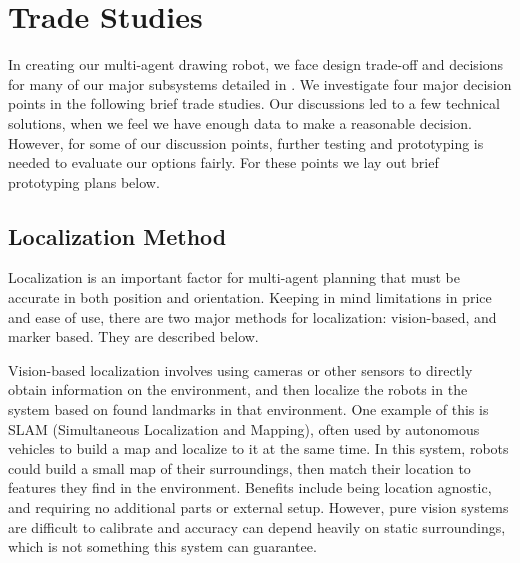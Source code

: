 
\section{Trade Studies}
\label{sec:trade_studies}


In creating our multi-agent drawing robot, we face design trade-off and decisions for many of our major subsystems detailed in . We investigate four major decision points in the following brief trade studies. Our discussions led to a few technical solutions, when we feel we have enough data to make a reasonable decision. However, for some of our discussion points, further testing and prototyping is needed to evaluate our options fairly. For these points we lay out brief prototyping plans below. 

\subsection{Localization Method}
\label{sec:trade_localization}
Localization is an important factor for multi-agent planning that must be accurate in both position and orientation. Keeping in mind limitations in price and ease of use, there are two major methods for localization: vision-based, and marker based. They are described below.

Vision-based localization involves using cameras or other sensors to directly obtain information on the environment, and then localize the robots in the system based on found landmarks in that environment. One example of this is SLAM (Simultaneous Localization and Mapping), often used by autonomous vehicles to build a map and localize to it at the same time. In this system, robots could build a small map of their surroundings, then match their location to features they find in the environment. Benefits include being location agnostic, and requiring no additional parts or external setup. However, pure vision systems are difficult to calibrate and accuracy can depend heavily on static surroundings, which is not something this system can guarantee.

